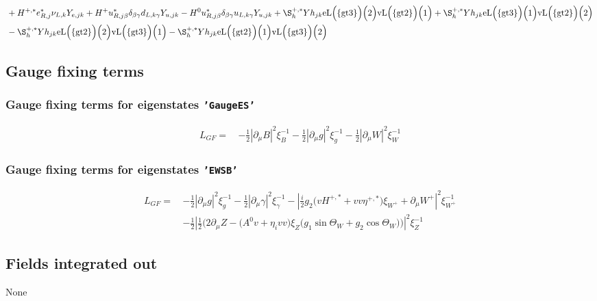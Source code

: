 \begin{align}
 &+H^{+,*} e^*_{R,{j}} \nu_{L,{k}} Y_{e,{j k}} +H^+ u^*_{R,{j \beta}} \delta_{\beta \gamma} d_{L,{k \gamma}} Y_{u,{j k}} - H^0 u^*_{R,{j \beta}} \delta_{\beta \gamma} u_{L,{k \gamma}} Y_{u,{j k}} +\S_h^{+,*} Yh_{{j k}} \text{eL}\Big(\{\text{gt3}\}\Big)\Big(2\Big) \text{vL}\Big(\{\text{gt2}\}\Big)\Big(1\Big) +\S_h^{+,*} Yh_{{j k}} \text{eL}\Big(\{\text{gt3}\}\Big)\Big(1\Big) \text{vL}\Big(\{\text{gt2}\}\Big)\Big(2\Big) \nonumber \\ 
 &- \S_h^{+,*} Yh_{{j k}} \text{eL}\Big(\{\text{gt2}\}\Big)\Big(2\Big) \text{vL}\Big(\{\text{gt3}\}\Big)\Big(1\Big) - \S_h^{+,*} Yh_{{j k}} \text{eL}\Big(\{\text{gt2}\}\Big)\Big(1\Big) \text{vL}\Big(\{\text{gt3}\}\Big)\Big(2\Big) 
\end{align} 
\subsection{Gauge fixing terms} 
\subsubsection{Gauge fixing terms for eigenstates {\tt 'GaugeES'} } 
\begin{align} 
L_{GF} = \, &-\frac{1}{2} |\partial_{\mu}B|^2 \xi_{B}^{-1}  -\frac{1}{2} |\partial_{\mu}g|^2 \xi_{g}^{-1}  -\frac{1}{2} |\partial_{\mu}W|^2 \xi_{W}^{-1} 
\end{align} 
\subsubsection{Gauge fixing terms for eigenstates {\tt 'EWSB'} } 
\begin{align} 
L_{GF} = \, &-\frac{1}{2} |\partial_{\mu}g|^2 \xi_{g}^{-1} -\frac{1}{2} |\partial_{\mu}\gamma|^2 \xi_{\gamma}^{-1} - |\frac{i}{2} g_2 \Big(v H^{+,*}  + vv \eta^{+,*} \Big)\xi_{W^+}  + \partial_{\mu}W^+|^2 \xi_{W^+}^{-1} \nonumber \\ 
 &-\frac{1}{2} |\frac{1}{2} \Big(2 \partial_{\mu}Z  - \Big(A^0 v  + \eta_i vv \Big)\xi_{Z} \Big(g_1 \sin\Theta_W   + g_2 \cos\Theta_W  \Big)\Big)|^2 \xi_{Z}^{-1} 
\end{align} 
\subsection{Fields integrated out} 
None 
